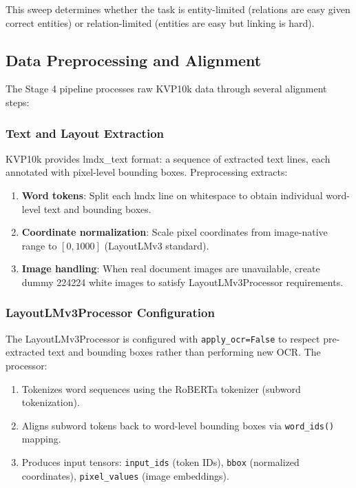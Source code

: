 This sweep determines whether the task is entity-limited (relations are easy given correct entities) or relation-limited (entities are easy but linking is hard).

\subsection{Data Preprocessing and Alignment}
\label{sec:stage4_data_prep}

The Stage 4 pipeline processes raw KVP10k data through several alignment steps:

\subsubsection{Text and Layout Extraction}

KVP10k provides lmdx\_text format: a sequence of extracted text lines, each annotated with pixel-level bounding boxes. Preprocessing extracts:

\begin{enumerate}
    \item \textbf{Word tokens}: Split each lmdx line on whitespace to obtain individual word-level text and bounding boxes.
    \item \textbf{Coordinate normalization}: Scale pixel coordinates from image-native range to $[0, 1000]$ (LayoutLMv3 standard).
    \item \textbf{Image handling}: When real document images are unavailable, create dummy 224\texttimes{}224 white images to satisfy LayoutLMv3Processor requirements.
\end{enumerate}

\subsubsection{LayoutLMv3Processor Configuration}

The LayoutLMv3Processor is configured with \texttt{apply\_ocr=False} to respect pre-extracted text and bounding boxes rather than performing new OCR. The processor:

\begin{enumerate}
    \item Tokenizes word sequences using the RoBERTa tokenizer (subword tokenization).
    \item Aligns subword tokens back to word-level bounding boxes via \texttt{word\_ids()} mapping.
    \item Produces input tensors: \texttt{input\_ids} (token IDs), \texttt{bbox} (normalized coordinates), \texttt{pixel\_values} (image embeddings).
\end{enumerate}

